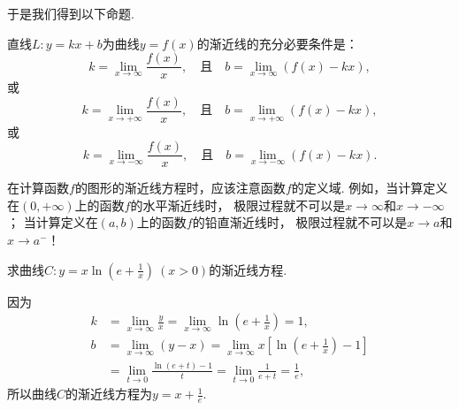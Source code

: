 于是我们得到以下命题.
\begin{proposition}
直线\(L: y = kx+b\)为曲线\(y = f(x)\)的渐近线的充分必要条件是：\[
	k = \lim_{x\to\infty} \frac{f(x)}{x},
	\quad\text{且}\quad
	b = \lim_{x\to\infty} \left( f(x) - kx \right),
\]
或\[
	k = \lim_{x\to+\infty} \frac{f(x)}{x},
	\quad\text{且}\quad
	b = \lim_{x\to+\infty} \left( f(x) - kx \right),
\]
或\[
	k = \lim_{x\to-\infty} \frac{f(x)}{x},
	\quad\text{且}\quad
	b = \lim_{x\to-\infty} \left( f(x) - kx \right).
\]
\end{proposition}

\begin{remark}
在计算函数\(f\)的图形的渐近线方程时，应该注意函数\(f\)的定义域.
例如，当计算定义在\((0,+\infty)\)上的函数\(f\)的水平渐近线时，
极限过程就不可以是\(x\to\infty\)和\(x\to-\infty\)；
当计算定义在\((a,b)\)上的函数\(f\)的铅直渐近线时，
极限过程就不可以是\(x \to a\)和\(x \to a^-\)！
\end{remark}


\begin{example}
求曲线\(C: y = x \ln(e+\frac1x)\ (x>0)\)的渐近线方程.
\begin{solution}
因为\begin{align*}
	k &= \lim_{x\to\infty} \frac{y}{x}
	= \lim_{x\to\infty} \ln(e+\frac1x)
	= 1, \\
	b &= \lim_{x\to\infty} (y-x)
	= \lim_{x\to\infty} x\left[ \ln(e+\frac1x) - 1 \right] \\
	&= \lim_{t\to0} \frac{\ln(e+t)-1}{t}
	= \lim_{t\to0} \frac1{e+t}
	= \frac1e,
\end{align*}
所以曲线\(C\)的渐近线方程为\(y = x + \frac1e\).
\end{solution}
\end{example}

